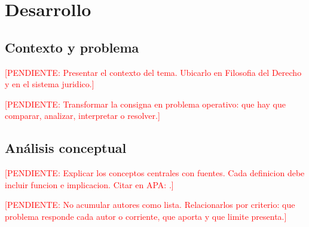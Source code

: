 \documentclass[
	spanish,
	letterpaper, oneside
]{article}
\newcommand{\pendiente}[1]{\textcolor{red}{[PENDIENTE: #1]}}
\begin{document}
%
%
\section{Desarrollo}

\subsection{Contexto y problema}

\pendiente{Presentar el contexto del tema. Ubicarlo en Filosofia del Derecho y en el sistema juridico.}

\pendiente{Transformar la consigna en problema operativo: que hay que comparar, analizar, interpretar o resolver.}

\subsection{Análisis conceptual}

\pendiente{Explicar los conceptos centrales con fuentes. Cada definicion debe incluir funcion e implicacion. Citar en APA: \citep{ruizrodriguezFilosofiaDerecho2009}.}

\pendiente{No acumular autores como lista. Relacionarlos por criterio: que problema responde cada autor o corriente, que aporta y que limite presenta.}
\end{document}
